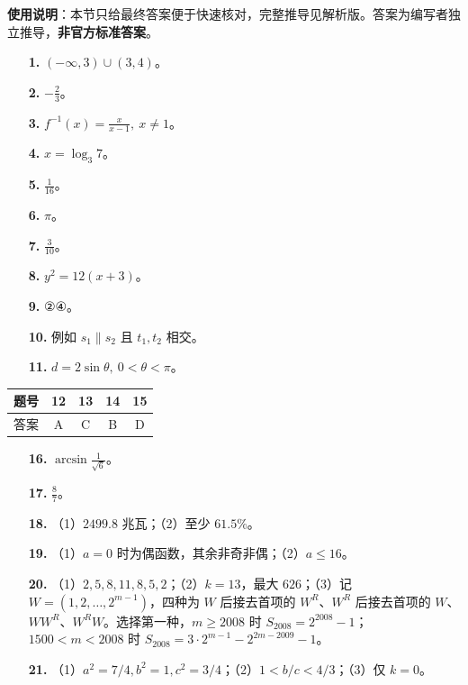 
\begin{gknotice}
\textbf{使用说明}：本节只给最终答案便于快速核对，完整推导见解析版。答案为编写者独立推导，\textbf{非官方标准答案}。
\end{gknotice}

\begin{itemize}[leftmargin=2.6em]
  \item[\textbf{1.}] $(-\infty,3)\cup(3,4)$。
  \item[\textbf{2.}] $-\frac23$。
  \item[\textbf{3.}] $f^{-1}(x)=\frac{x}{x-1},\ x\ne1$。
  \item[\textbf{4.}] $x=\log_3 7$。
  \item[\textbf{5.}] $\frac1{16}$。
  \item[\textbf{6.}] $\pi$。
  \item[\textbf{7.}] $\frac3{10}$。
  \item[\textbf{8.}] $y^2=12(x+3)$。
  \item[\textbf{9.}] ②④。
  \item[\textbf{10.}] 例如 $s_1\parallel s_2$ 且 $t_1,t_2$ 相交。
  \item[\textbf{11.}] $d=2\sin\theta,\ 0<\theta<\pi$。
\end{itemize}

\begin{center}\begin{tabular}{ccccc}
\toprule
题号 & 12 & 13 & 14 & 15 \\
\midrule
答案 & A & C & B & D \\
\bottomrule
\end{tabular}\end{center}

\begin{itemize}[leftmargin=2.6em]
  \item[\textbf{16.}] $\arcsin\frac1{\sqrt6}$。
  \item[\textbf{17.}] $\frac87$。
  \item[\textbf{18.}] （1）$2499.8$ 兆瓦；（2）至少 $61.5\%$。
  \item[\textbf{19.}] （1）$a=0$ 时为偶函数，其余非奇非偶；（2）$a\le16$。
  \item[\textbf{20.}] （1）$2,5,8,11,8,5,2$；（2）$k=13$，最大 $626$；（3）记 $W=(1,2,\ldots,2^{m-1})$，四种为 $W$ 后接去首项的 $W^R$、$W^R$ 后接去首项的 $W$、$WW^R$、$W^RW$。选择第一种，$m\ge2008$ 时 $S_{2008}=2^{2008}-1$；$1500<m<2008$ 时 $S_{2008}=3\cdot2^{m-1}-2^{2m-2009}-1$。
  \item[\textbf{21.}] （1）$a^2=7/4,b^2=1,c^2=3/4$；（2）$1<b/c<4/3$；（3）仅 $k=0$。
\end{itemize}
